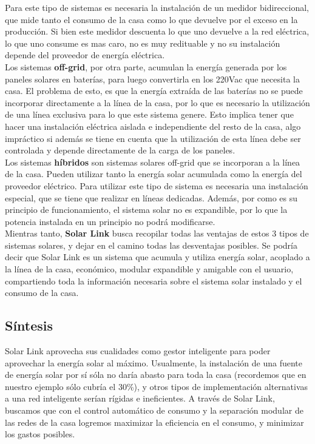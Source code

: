 Para este tipo de sistemas es necesaria la instalación de un medidor bidireccional, que mide tanto el consumo de la casa como lo que devuelve por el exceso en la producción. Si bien este medidor descuenta lo que uno devuelve a la red eléctrica, lo que uno consume es mas caro, no es muy redituable y no su instalación depende del proveedor de energía eléctrica.\\

Los sistemas \textbf{off-grid}, por otra parte, acumulan la energía generada por los paneles solares en baterías, para luego convertirla en los 220Vac que necesita la casa. El problema de esto, es que la energía extraída de las baterías no se puede incorporar directamente a la línea de la casa, por lo que es necesario la utilización de una línea exclusiva para lo que este sistema genere. Esto implica tener que hacer una instalación eléctrica aislada e independiente del resto de la casa, algo impráctico si además se tiene en cuenta que la utilización de esta línea debe ser controlada y depende directamente de la carga de los paneles.\\

Los sistemas \textbf{híbridos} son sistemas solares off-grid que se incorporan a la línea de la casa. Pueden utilizar tanto la energía solar acumulada como la energía del proveedor eléctrico. Para utilizar este tipo de sistema es necesaria una instalación especial, que se tiene que realizar en líneas dedicadas. Además, por como es su principio de funcionamiento, el sistema solar no es expandible, por lo que la potencia instalada en un principio no podrá modificarse.\\

Mientras tanto, \textbf{Solar Link} busca recopilar todas las ventajas de estos 3 tipos de sistemas solares, y dejar en el camino todas las desventajas posibles. Se podría decir que Solar Link es un sistema que acumula y utiliza energía solar, acoplado a la línea de la casa, económico, modular expandible y amigable con el usuario, compartiendo toda la información necesaria sobre el sistema solar instalado y el consumo de la casa.

\subsection{Síntesis}
Solar Link aprovecha sus cualidades como gestor inteligente para poder aprovechar la energía solar al máximo. Usualmente, la instalación de una fuente de energía solar por sí sóla no daría abasto para toda la casa (recordemos que en nuestro ejemplo sólo cubría el 30\%), y otros tipos de implementación alternativas a una red inteligente serían rígidas e ineficientes. A través de Solar Link, buscamos que con el control automático de consumo y la separación modular de las redes de la casa logremos maximizar la eficiencia en el consumo, y minimizar los gastos posibles.\\

